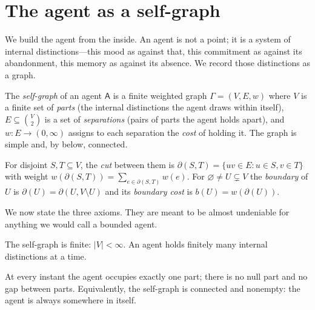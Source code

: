 \documentclass[11pt,twocolumn,a4paper]{article}
\newcommand{\Agent}{\mathsf{A}}
\newcommand{\Self}{\Gamma}          %
\newcommand{\V}{V}
\newcommand{\E}{E}
\newcommand{\wt}{w}
\newcommand{\cut}{\partial}
\newcommand{\abs}[1]{\lvert#1\rvert}
\begin{document}
\section{The agent as a self-graph}
\label{sec:setting}

We build the agent from the inside. An agent is not a point; it is a
system of internal distinctions---this mood as against that, this
commitment as against its abandonment, this memory as against its
absence. We record those distinctions as a graph.

\begin{definition}
\label{def:selfgraph}
The \emph{self-graph} of an agent $\Agent$ is a finite weighted graph
$\Self=(\V,\E,\wt)$ where $\V$ is a finite set of \emph{parts} (the
internal distinctions the agent draws within itself), $\E\subseteq
\binom{\V}{2}$ is a set of \emph{separations} (pairs of parts the agent
holds apart), and $\wt:\E\to(0,\infty)$ assigns to each separation the
\emph{cost} of holding it. The graph is simple and, by
 below, connected.
\end{definition}

\begin{definition}
\label{def:cut}
For disjoint $S,T\subseteq\V$, the \emph{cut} between them is
$\cut(S,T)=\{uv\in\E: u\in S, v\in T\}$ with weight
$\wt(\cut(S,T))=\sum_{e\in\cut(S,T)}\wt(e)$. For $\varnothing\neq
U\subsetneq\V$ the \emph{boundary} of $U$ is $\cut(U)=\cut(U,\V\setminus
U)$ and its \emph{boundary cost} is $b(U)=\wt(\cut(U))$.
\end{definition}

We now state the three axioms. They are meant to be almost
undeniable for anything we would call a bounded agent.

\begin{axiom}[Finiteness]
\label{ax:finite}
The self-graph is finite: $\abs{\V}<\infty$. An agent holds finitely many
internal distinctions at a time.
\end{axiom}

\begin{axiom}
\label{ax:present}
At every instant the agent occupies exactly one part; there is no
null part and no gap between parts. Equivalently, the self-graph is
connected and nonempty: the agent is always somewhere in itself.
\end{axiom}
\end{document}
